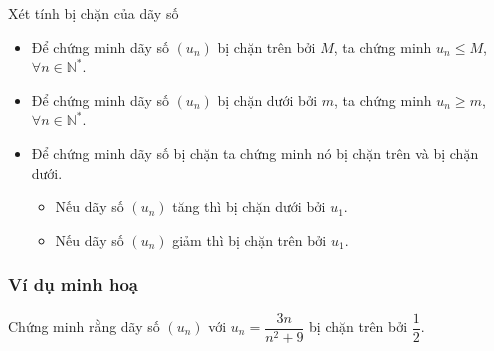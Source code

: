 
\begin{dang}{Xét tính bị chặn của dãy số}
	\begin{itemize}
		\item Để chứng minh dãy số $(u_n)$ bị chặn trên bởi $M$, ta chứng minh $u_n\le M$, $\forall n\in\mathbb{N}^\ast$.
		\item Để chứng minh dãy số $(u_n)$ bị chặn dưới bởi $m$, ta chứng minh $u_n\ge m$, $\forall n\in\mathbb{N}^\ast$.
		\item Để chứng minh dãy số bị chặn ta chứng minh nó bị chặn trên và bị chặn dưới.
		\begin{itemize}
			\item Nếu dãy số $(u_n)$ tăng thì bị chặn dưới bởi $u_1$.
			\item Nếu dãy số $(u_n)$ giảm thì bị chặn trên bởi $u_1$.
		\end{itemize}
	\end{itemize}
\end{dang}
\subsubsection{Ví dụ minh hoạ}

\begin{vd}%
	Chứng minh rằng dãy số $(u_n)$ với $u_n=\dfrac{3n}{n^2+9}$ bị chặn trên bởi $\dfrac{1}{2}$.
\end{vd}

